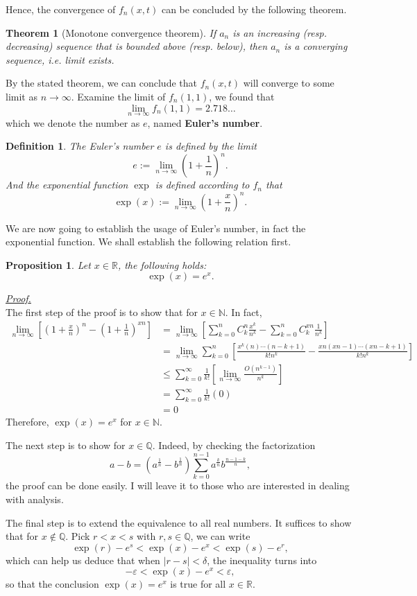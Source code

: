 \documentclass[12pt]{article}
\newtheorem{definition}{Definition}[section]
\newtheorem*{theorem}{Theorem}
\newtheorem*{proposition}{Proposition}
\renewenvironment{proof}[1][Proof]{\begin{snugshade*} \underline{\textit{{#1}.}}\\}{\hfill \qedsymbol \end{snugshade*}}
\begin{document}
    Hence, the convergence of $f_n(x,t)$ can be concluded by the following theorem.

    \begin{theorem}[Monotone convergence theorem]
        If $a_n$ is an increasing (resp. decreasing) sequence that is bounded above (resp. below), then $a_n$ is a converging sequence, i.e. limit exists.
    \end{theorem}

    By the stated theorem, we can conclude that $f_n(x,t)$ will converge to some limit as $n\to \infty$. Examine the limit of $f_n(1,1)$, we found that \[\lim_{n\to \infty}f_n(1,1) = 2.718\dots\] which we denote the number as $e$, named \textbf{Euler's number}.

    \begin{definition}
        The Euler's number $e$ is defined by the limit \[e:=\lim_{n\to \infty}(1+\frac{1}{n})^n.\] And the exponential function $\exp$ is defined according to $f_n$ that \[\exp(x):=\lim_{n\to \infty}(1+\frac{x}{n})^n.\]
    \end{definition}

    We are now going to establish the usage of Euler's number, in fact the exponential function. We shall establish the following relation first.

    \begin{proposition}
        Let $x\in\mathbb{R}$, the following holds: \[\exp(x)=e^{x}.\]
    \end{proposition}

    \begin{proof}
        The first step of the proof is to show that for $x\in\mathbb{N}$. In fact, \begin{align*}
            \lim_{n\to \infty}[(1+\frac{x}{n})^n-(1+\frac{1}{n})^{xn}]&=\lim_{n\to \infty}[\sum_{k=0}^{n}C_k^n \frac{x^k}{n^k}-\sum_{k=0}^{n}C_k^{xn}\frac{1}{n^k}]\\
            &=\lim_{n\to\infty}\sum_{k=0}^{n}[\frac{x^k(n)\cdots(n-k+1)}{k!n^k}-\frac{xn(xn-1)\cdots (xn-k+1)}{k!n^k}]\\
            &\leq \sum_{k=0}^{\infty}\frac{1}{k!}[\lim_{n\to \infty}\frac{O(n^{k-1})}{n^k}]\\
            &=\sum_{k=0}^{\infty}\frac{1}{k!}(0)\\
            &=0
        \end{align*}
        Therefore, $\exp(x)=e^{x}$ for $x\in\mathbb{N}$.

        The next step is to show for $x\in\mathbb{Q}$. Indeed, by checking the factorization \[a-b=(a^{\frac{1}{n}}-b^{\frac{1}{n}})\sum_{k=0}^{n-1}a^{\frac{k}{n}}b^{\frac{n-1-k}{n}},\] the proof can be done easily. I will leave it to those who are interested in dealing with analysis.

        The final step is to extend the equivalence to all real numbers. It suffices to show that for $x\notin \mathbb{Q}$. Pick $r<x<s$ with $r,s\in\mathbb{Q}$, we can write \[\exp(r)-e^s < \exp(x)-e^x < \exp(s)-e^r,\] which can help us deduce that when $|r-s|<\delta$, the inequality turns into \[-\varepsilon< \exp(x)-e^x < \varepsilon,\] so that the conclusion $\exp(x)=e^x$ is true for all $x\in\mathbb{R}$.
    \end{proof}
\end{document}
